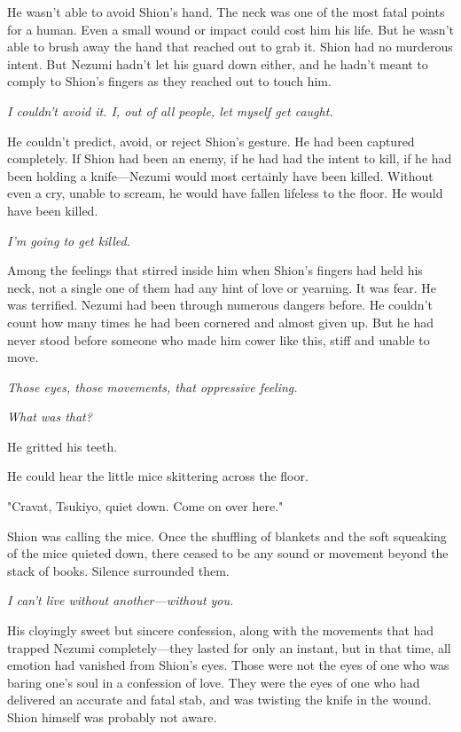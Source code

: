 He wasn't able to avoid Shion's hand. The neck was one of the most fatal
points for a human. Even a small wound or impact could cost him his
life. But he wasn't able to brush away the hand that reached out to grab
it. Shion had no murderous intent. But Nezumi hadn't let his guard down
either, and he hadn't meant to comply to Shion's fingers as they reached
out to touch him.

\emph{I couldn't avoid it. I, out of all people, let myself get caught.}

He couldn't predict, avoid, or reject Shion's gesture. He had been
captured completely. If Shion had been an enemy, if he had had the
intent to kill, if he had been holding a knife---Nezumi would most
certainly have been killed. Without even a cry, unable to scream, he
would have fallen lifeless to the floor. He would have been killed.

\emph{I'm going to get killed.}

Among the feelings that stirred inside him when Shion's fingers had held
his neck, not a single one of them had any hint of love or yearning. It
was fear. He was terrified. Nezumi had been through numerous dangers
before. He couldn't count how many times he had been cornered and almost
given up. But he had never stood before someone who made him cower like
this, stiff and unable to move.

\emph{Those eyes, those movements, that oppressive feeling.}

\emph{What was that?}

He gritted his teeth.

He could hear the little mice skittering across the floor.

"Cravat, Tsukiyo, quiet down. Come on over here."

Shion was calling the mice. Once the shuffling of blankets and the soft
squeaking of the mice quieted down, there ceased to be any sound or
movement beyond the stack of books. Silence surrounded them.

\emph{I can't live without another---without you.}

His cloyingly sweet but sincere confession, along with the movements
that had trapped Nezumi completely---they lasted for only an instant, but
in that time, all emotion had vanished from Shion's eyes. Those were not
the eyes of one who was baring one's soul in a confession of love. They
were the eyes of one who had delivered an accurate and fatal stab, and
was twisting the knife in the wound. Shion himself was probably not
aware.

